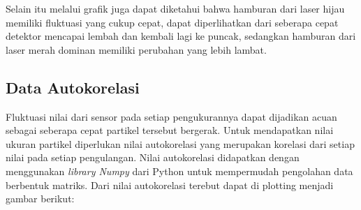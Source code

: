 Selain itu melalui grafik juga dapat diketahui bahwa hamburan
dari laser hijau memiliki fluktuasi yang cukup cepat, dapat
diperlihatkan dari seberapa cepat detektor mencapai lembah dan
kembali lagi ke puncak, sedangkan hamburan dari laser merah
dominan memiliki perubahan yang lebih lambat.

\subsection{Data Autokorelasi}
Fluktuasi nilai dari sensor pada setiap pengukurannya dapat
dijadikan acuan sebagai seberapa cepat partikel tersebut
bergerak. Untuk mendapatkan nilai ukuran partikel diperlukan
nilai autokorelasi yang merupakan korelasi dari setiap nilai
pada setiap pengulangan. Nilai autokorelasi didapatkan dengan
menggunakan \textit{library Numpy} dari Python untuk mempermudah
pengolahan data berbentuk matriks. Dari nilai autokorelasi
terebut dapat di plotting menjadi gambar berikut:

